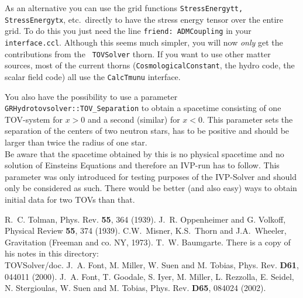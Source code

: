 As an alternative you can use the grid functions {\tt StressEnergytt,
  StressEnergytx}, etc.~directly to have the stress energy tensor over
the entire grid. To do this you just need the line {\tt friend:
  ADMCoupling} in your {\tt interface.ccl}. Although this seems much
simpler, you will now \emph{only} get the contributions from the {\tt
  TOVSolver} thorn. If you want to use other matter sources, most of
the current thorns ({\tt CosmologicalConstant}, the hydro code, the
scalar field code) all use the {\tt CalcTmunu} interface.

You also have the possibility to use a parameter
{\tt GRHydrotovsolver::TOV\_Separation} to obtain a spacetime consisting
of one TOV-system for $x>0$ and a second (similar) for $x<0$. This parameter
sets the separation of the centers of two neutron stars, has to be positive
and should be larger than twice the radius of one star.\\
Be aware that the spacetime obtained by this is no physical spacetime and
no solution of Einsteins Equations and therefore an IVP-run has to follow.
This parameter was only introduced for testing purposes of the IVP-Solver
and should only be considered as such. There would be better (and also easy)
ways to obtain initial data for two TOVs than that.





\begin{thebibliography}{10}

R.~C. Tolman, Phys. Rev. {\bf 55}, 364 (1939).
%
J.~R. Oppenheimer and G. Volkoff, Physical Review {\bf 55}, 374 (1939).
%
C.W.~Misner, K.S.~Thorn and J.A.~Wheeler, Gravitation (Freeman and co. NY, 1973).
%
T.~W. Baumgarte. There is a copy of his notes in this directory: \\
TOVSolver/doc.
%
J.~A. Font, M. Miller, W. Suen and M. Tobias, Phys. Rev. {\bf D61},
044011 (2000).
%
J.~A. Font, T. Goodale, S. Iyer, M. Miller, L. Rezzolla, E. Seidel,
N. Stergioulas, W. Suen and M. Tobias, Phys. Rev. {\bf D65},
084024 (2002).


\end{thebibliography}








